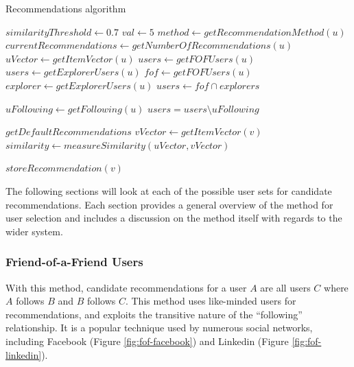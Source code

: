 \begin{algorithm}
\caption{Recommendations algorithm}
\label{alg:recommendations}
\begin{algorithmic}[1]
\State $similarityThreshold\gets 0.7$
\State $val\gets 5$
	\State $method\gets getRecommendationMethod(u)$
	\State $currentRecommendations\gets getNumberOfRecommendations(u)$
		\State $uVector\gets getItemVector(u)$
			\State $users\gets getFOFUsers(u)$
		\EndIf
			\State $users\gets getExplorerUsers(u)$
		\EndIf
			\State $fof\gets getFOFUsers(u)$
			\State $explorer\gets getExplorerUsers(u)$
			\State $users\gets fof \cap explorers$
		\EndIf
		
		\State $uFollowing\gets getFollowing(u)$
		\State $users = users \setminus uFollowing$
		
			\State $getDefaultRecommendations$
		\Else
				\State $vVector\gets getItemVector(v)$
				\State $similarity\gets measureSimilarity(uVector, vVector)$
			
					\State $storeRecommendation(v)$
				\EndIf
			\EndFor
		\EndIf
	\EndIf
\EndFor
\end{algorithmic}
\end{algorithm}

The following sections will look at each of the possible user sets for candidate recommendations. Each section provides a general overview of the method for user selection and includes a discussion on the method itself with regards to the wider system.

\subsubsection{Friend-of-a-Friend Users}
With this method, candidate recommendations for a user $A$ are all users $C$ where $A$ follows $B$ and $B$ follows $C$. This method uses like-minded users for recommendations, and exploits the transitive nature of the ``following'' relationship. It is a popular technique used by numerous social networks, including Facebook (Figure \ref{fig:fof-facebook}) and Linkedin (Figure \ref{fig:fof-linkedin}).

